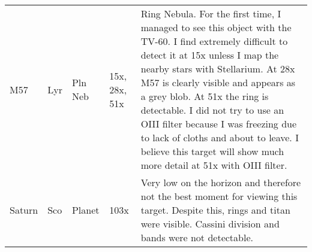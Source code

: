 \begin{longtable}{ p{0.7in}  p{0.3in}  p{0.6in}  p{0.9in}  p{5.8in} }
M57 & Lyr & Pln Neb & 15x, 28x, 51x & Ring Nebula. For the first time, I managed to see this object with the TV-60. I find extremely difficult to detect it at 15x unless I map the nearby stars with Stellarium. At 28x M57 is clearly visible and appears as a grey blob. At 51x the ring is detectable. I did not try to use an OIII filter because I was freezing due to lack of cloths and about to leave. I believe this target will show much more detail at 51x with OIII filter. \\ 
Saturn & Sco & Planet & 103x & Very low on the horizon and therefore not the best moment for viewing this target. Despite this, rings and titan were visible. Cassini division and bands were not detectable. \\ 
\hline 
\end{longtable} 
